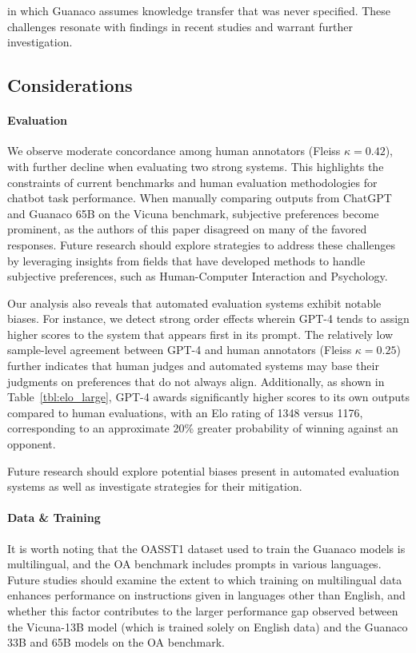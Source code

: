 in which {Guanaco} assumes knowledge transfer that was never specified. These challenges resonate with findings in recent studies \cite{sap2022neural} and warrant further investigation.

\subsection{Considerations}
\label{ssec:considerations}

\paragraph{Evaluation}

We observe moderate concordance among human annotators (Fleiss $\kappa=0.42$), with further decline when evaluating two strong systems. This highlights the constraints of current benchmarks and human evaluation methodologies for chatbot task performance. When manually comparing outputs from ChatGPT and {Guanaco} 65B on the Vicuna benchmark, subjective preferences become prominent, as the authors of this paper disagreed on many of the favored responses. Future research should explore strategies to address these challenges by leveraging insights from fields that have developed methods to handle subjective preferences, such as Human-Computer Interaction and Psychology.

Our analysis also reveals that automated evaluation systems exhibit notable biases. For instance, we detect strong order effects wherein GPT-4 tends to assign higher scores to the system that appears first in its prompt. The relatively low sample-level agreement between GPT-4 and human annotators (Fleiss $\kappa=0.25$) further indicates that human judges and automated systems may base their judgments on preferences that do not always align. Additionally, as shown in Table~\ref{tbl:elo_large}, GPT-4 awards significantly higher scores to its own outputs compared to human evaluations, with an Elo rating of 1348 versus 1176, corresponding to an approximate 20\% greater probability of winning against an opponent.

Future research should explore potential biases present in automated evaluation systems as well as investigate strategies for their mitigation.

\paragraph{Data \& Training} It is worth noting that the OASST1 dataset used to train the {Guanaco} models is multilingual, and the OA benchmark includes prompts in various languages. Future studies should examine the extent to which training on multilingual data enhances performance on instructions given in languages other than English, and whether this factor contributes to the larger performance gap observed between the Vicuna-13B model (which is trained solely on English data) and the {Guanaco} 33B and 65B models on the OA benchmark.

